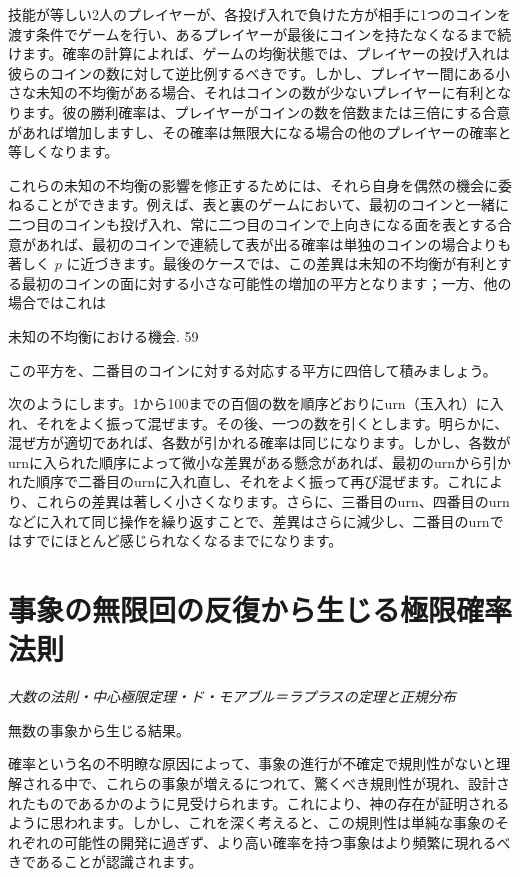 \documentclass[a4paper,11pt,openany]{ltjsbook}
\begin{document}
技能が等しい2人のプレイヤーが、各投げ入れで負けた方が相手に1つのコインを渡す条件でゲームを行い、あるプレイヤーが最後にコインを持たなくなるまで続けます。確率の計算によれば、ゲームの均衡状態では、プレイヤーの投げ入れは彼らのコインの数に対して逆比例するべきです。しかし、プレイヤー間にある小さな未知の不均衡がある場合、それはコインの数が少ないプレイヤーに有利となります。彼の勝利確率は、プレイヤーがコインの数を倍数または三倍にする合意があれば増加しますし、その確率は無限大になる場合の他のプレイヤーの確率と等しくなります。

これらの未知の不均衡の影響を修正するためには、それら自身を偶然の機会に委ねることができます。例えば、表と裏のゲームにおいて、最初のコインと一緒に二つ目のコインも投げ入れ、常に二つ目のコインで上向きになる面を表とする合意があれば、最初のコインで連続して表が出る確率は単独のコインの場合よりも著しく $p$ に近づきます。最後のケースでは、この差異は未知の不均衡が有利とする最初のコインの面に対する小さな可能性の増加の平方となります；一方、他の場合ではこれは

未知の不均衡における機会.         59

この平方を、二番目のコインに対する対応する平方に四倍して積みましょう。

次のようにします。1から100までの百個の数を順序どおりにurn（玉入れ）に入れ、それをよく振って混ぜます。その後、一つの数を引くとします。明らかに、混ぜ方が適切であれば、各数が引かれる確率は同じになります。しかし、各数がurnに入られた順序によって微小な差異がある懸念があれば、最初のurnから引かれた順序で二番目のurnに入れ直し、それをよく振って再び混ぜます。これにより、これらの差異は著しく小さくなります。さらに、三番目のurn、四番目のurnなどに入れて同じ操作を繰り返すことで、差異はさらに減少し、二番目のurnではすでにほとんど感じられなくなるまでになります。

\newpage

\chapter{事象の無限回の反復から生じる極限確率法則}
\label{ch:viii}

\begin{center}
\large\textit{大数の法則・中心極限定理・ド・モアブル＝ラプラスの定理と正規分布}
\end{center}
\vspace{4mm}

無数の事象から生じる結果。

確率という名の不明瞭な原因によって、事象の進行が不確定で規則性がないと理解される中で、これらの事象が増えるにつれて、驚くべき規則性が現れ、設計されたものであるかのように見受けられます。これにより、神の存在が証明されるように思われます。しかし、これを深く考えると、この規則性は単純な事象のそれぞれの可能性の開発に過ぎず、より高い確率を持つ事象はより頻繁に現れるべきであることが認識されます。
\end{document}
